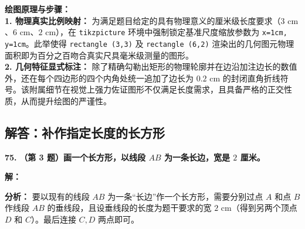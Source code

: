 \vspace{0.4cm}
{\small\color{blue!70!black}
\textbf{绘图原理与步骤：}\\
\textbf{1. 物理真实比例映射：} 为满足题目给定的具有物理意义的厘米级长度要求（$3\text{ cm}$、$6\text{ cm}、2\text{ cm}$），在 \texttt{tikzpicture} 环境中强制锁定基准尺度缩放参数为 \texttt{x=1cm, y=1cm}。此举使得 \texttt{rectangle (3,3)} 及 \texttt{rectangle (6,2)} 渲染出的几何图元物理面积即为百分之百吻合真实尺具毫米级测量的图形。\\
\textbf{2. 几何特征显式标注：} 除了精确勾勒出矩形的物理轮廓并在边沿加注边长的数值外，还在每个四边形的四个内角处统一追加了边长为 $0.2\text{ cm}$ 的封闭直角折线符号。该附属细节在视觉上强力佐证图形不仅满足长度需求，且具备严格的正交性质，从而提升绘图的严谨性。
}

\newpage

\newpage

\subsection{解答：补作指定长度的长方形}

\vspace{0.6cm}

\textbf{\LARGE 75.} \textbf{（第 3 题）画一个长方形，以线段 $AB$ 为一条长边，宽是 $2$ 厘米。}

\vspace{0.4cm}
\textbf{解：}

\textbf{分析：} 要以现有的线段 $AB$ 为一条“长边”作一个长方形，需要分别过点 $A$ 和点 $B$ 作线段 $AB$ 的垂线段，且设垂线段的长度为题干要求的宽 $2\text{ cm}$（得到另两个顶点 $D$ 和 $C$）。最后连接 $C, D$ 两点即可。

